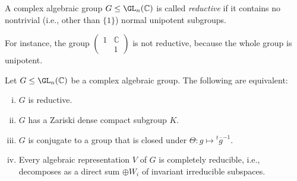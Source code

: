 \documentclass[reqno]{amsart} 
\begin{document}
\begin{definition}
  A complex algebraic group $G \leq \GL_n(\mathbb{C})$ is called \emph{reductive} if it contains no nontrivial (i.e., other than $\{1\}$) normal unipotent subgroups.
\end{definition}

For instance, the group $
\begin{pmatrix}
  1 & \mathbb{C}  \\
  & 1
\end{pmatrix}
$ is not reductive, because the whole group is unipotent.

\begin{theorem}\label{thm:reductive-groups}
  Let $G \leq \GL_n(\mathbb{C})$ be a complex algebraic group.  The following are equivalent:
  \begin{enumerate}
[(i)]
  \item $G$ is reductive.
  \item $G$ has a Zariski dense compact subgroup $K$.
  \item $G$ is conjugate to a group that is closed under $\Theta : g \mapsto {}^t \overline{g} ^{-1}$.
  \item Every algebraic representation $V$ of $G$ is completely reducible, i.e., decomposes as a direct sum $\oplus W_i$ of invariant irreducible subspaces.
  \end{enumerate}
\end{theorem}
\end{document}
